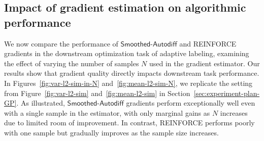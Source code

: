  





\subsection{Impact of gradient estimation on algorithmic performance}
\label{sec:gradient_estimation_algorithmic_performance}

We now compare the performance of $\mathsf{Smoothed\text{-}Autodiff}$  and \textsf{REINFORCE} gradients in the downstream optimization task of adaptive labeling, examining the effect of varying the number of samples $N$ used in the gradient estimator. Our results show that gradient quality directly impacts downstream task performance. In Figures~\ref{fig:var-l2-sim-in-N} and~\ref{fig:mean-l2-sim-N}, we   replicate the setting from 
Figure~\ref{fig:var-l2-sim} and~\ref{fig:mean-l2-sim}  in Section~\ref{sec:experiment-plan-GP}. As illustrated, $\mathsf{Smoothed\text{-}Autodiff}$ gradients perform exceptionally well even with a single sample in the estimator, with only marginal gains as $N$ increases due to limited room of improvement. In contrast, \textsf{REINFORCE} performs poorly with one sample but gradually improves as the sample size increases.

 




